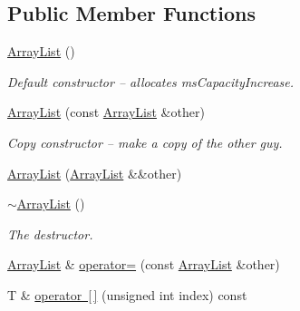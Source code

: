 \subsection*{Public Member Functions}
\begin{DoxyCompactItemize}
\item 
\mbox{\label{classssuds_1_1_array_list_a17073605b1b8e31ca126e61db633c57d}} 
\mbox{\hyperlink{classssuds_1_1_array_list_a17073605b1b8e31ca126e61db633c57d}{Array\+List}} ()
\begin{DoxyCompactList}\small\item\em Default constructor -- allocates ms\+Capacity\+Increase. \end{DoxyCompactList}\item 
\mbox{\label{classssuds_1_1_array_list_acc8c635fece5189238f20e4df1e9e899}} 
\mbox{\hyperlink{classssuds_1_1_array_list_acc8c635fece5189238f20e4df1e9e899}{Array\+List}} (const \mbox{\hyperlink{classssuds_1_1_array_list}{Array\+List}} \&other)
\begin{DoxyCompactList}\small\item\em Copy constructor -- make a copy of the other guy. \end{DoxyCompactList}\item 
\mbox{\hyperlink{classssuds_1_1_array_list_ad351338073d3009c376cc41ebd1a3fa1}{Array\+List}} (\mbox{\hyperlink{classssuds_1_1_array_list}{Array\+List}} \&\&other)
\item 
\mbox{\label{classssuds_1_1_array_list_a334e1f8861f34a0da7230aeec7571e3c}} 
\mbox{\hyperlink{classssuds_1_1_array_list_a334e1f8861f34a0da7230aeec7571e3c}{$\sim$\+Array\+List}} ()
\begin{DoxyCompactList}\small\item\em The destructor. \end{DoxyCompactList}\item 
\mbox{\hyperlink{classssuds_1_1_array_list}{Array\+List}} \& \mbox{\hyperlink{classssuds_1_1_array_list_a01208c20d1e73244c0ba7876e8f16f45}{operator=}} (const \mbox{\hyperlink{classssuds_1_1_array_list}{Array\+List}} \&other)
\item 
\mbox{\label{classssuds_1_1_array_list_a0fdcc20f9b6b4d02fcf259ce543e9953}} 
T \& \mbox{\hyperlink{classssuds_1_1_array_list_a0fdcc20f9b6b4d02fcf259ce543e9953}{operator \mbox{[}$\,$\mbox{]}}} (unsigned int index) const

\end{DoxyCompactItemize}
